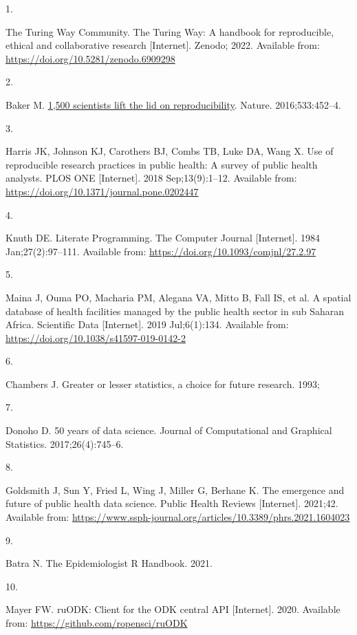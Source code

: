 \documentclass[
  letterpaper,
  DIV=11,
  numbers=noendperiod,
  oneside]{scrreprt}
\newlength{\cslhangindent}
\newlength{\csllabelwidth}
\newlength{\cslentryspacingunit} %
\newenvironment{CSLReferences}[2] %
 {%
  \setlength{\parindent}{0pt}
  \ifodd #1
  \let\oldpar\par
  \def\par{\hangindent=\cslhangindent\oldpar}
  \fi
  \setlength{\parskip}{#2\cslentryspacingunit}
 }%
 {}
\newcommand{\CSLLeftMargin}[1]{\parbox[t]{\csllabelwidth}{#1}}
\newcommand{\CSLRightInline}[1]{\parbox[t]{\linewidth - \csllabelwidth}{#1}\break}
\begin{document}
\hypertarget{refs}{}
\begin{CSLReferences}{0}{0}
\leavevmode{}%
\CSLLeftMargin{1. }%
\CSLRightInline{The Turing Way Community. {The Turing Way: A handbook
for reproducible, ethical and collaborative research} {[}Internet{]}.
Zenodo; 2022. Available from:
\url{https://doi.org/10.5281/zenodo.6909298}}

\leavevmode{}%
\CSLLeftMargin{2. }%
\CSLRightInline{Baker M. \href{https://doi.org/10.1038/533452a}{1,500
scientists lift the lid on reproducibility}. Nature. 2016;533:452--4. }

\leavevmode{}%
\CSLLeftMargin{3. }%
\CSLRightInline{Harris JK, Johnson KJ, Carothers BJ, Combs TB, Luke DA,
Wang X. Use of reproducible research practices in public health: {A}
survey of public health analysts. PLOS ONE {[}Internet{]}. 2018
Sep;13(9):1--12. Available from:
\url{https://doi.org/10.1371/journal.pone.0202447}}

\leavevmode{}%
\CSLLeftMargin{4. }%
\CSLRightInline{Knuth DE. {Literate Programming}. The Computer Journal
{[}Internet{]}. 1984 Jan;27(2):97--111. Available from:
\url{https://doi.org/10.1093/comjnl/27.2.97}}

\leavevmode{}%
\CSLLeftMargin{5. }%
\CSLRightInline{Maina J, Ouma PO, Macharia PM, Alegana VA, Mitto B, Fall
IS, et al. A spatial database of health facilities managed by the public
health sector in sub {Saharan} {Africa}. Scientific Data {[}Internet{]}.
2019 Jul;6(1):134. Available from:
\url{https://doi.org/10.1038/s41597-019-0142-2}}

\leavevmode{}%
\CSLLeftMargin{6. }%
\CSLRightInline{Chambers J. Greater or lesser statistics, a choice for
future research. 1993; }

\leavevmode{}%
\CSLLeftMargin{7. }%
\CSLRightInline{Donoho D. 50 years of data science. Journal of
Computational and Graphical Statistics. 2017;26(4):745--6. }

\leavevmode{}%
\CSLLeftMargin{8. }%
\CSLRightInline{Goldsmith J, Sun Y, Fried L, Wing J, Miller G, Berhane
K. The emergence and future of public health data science. Public Health
Reviews {[}Internet{]}. 2021;42. Available from:
\url{https://www.ssph-journal.org/articles/10.3389/phrs.2021.1604023}}

\leavevmode{}%
\CSLLeftMargin{9. }%
\CSLRightInline{Batra N. {The Epidemiologist R Handbook}. 2021. }

\leavevmode{}%
\CSLLeftMargin{10. }%
\CSLRightInline{Mayer FW. ruODK: Client for the ODK central API
{[}Internet{]}. 2020. Available from:
\url{https://github.com/ropensci/ruODK}}

\end{CSLReferences}
\end{document}
